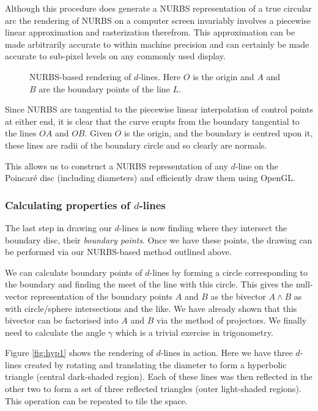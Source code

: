 Although this procedure does generate a NURBS representation of a true
circular arc the rendering of NURBS on a computer screen invariably involves
a piecewise linear approximation and rasterization therefrom. This approximation
can be made arbitrarily accurate to within machine precision and can certainly
be made accurate to sub-pixel levels on any commonly used display.

\begin{figure} \centering
{}
\caption{NURBS-based rendering of $d$-lines. Here $O$ is the origin and
$A$ and $B$ are the boundary points of the line $L$.}
\label{fig:nurbs}
\end{figure}

Since NURBS are tangential to the piecewise linear interpolation of control 
points
at either end, it is clear that the curve erupts from the boundary
tangential to the lines $OA$ and $OB$. Given $O$ is the origin, and the
boundary is centred upon it, these lines are radii of the boundary
circle and so clearly are normals.

This allows us to construct a NURBS representation of any $d$-line
on the Poincar\'e disc (including diameters) and efficiently draw them
using OpenGL. 

\subsubsection{Calculating properties of $d$-lines}

The last step in drawing our $d$-lines is now finding where they intersect
the boundary disc, their \emph{boundary points}. 
Once we have these points, the drawing can be performed
via our NURBS-based method outlined above.

We can calculate boundary points of $d$-lines
by forming a circle 
corresponding to the boundary and finding the 
meet of the line with this circle. This gives the null-vector
representation of the boundary points $A$ and $B$ as the
bivector $A \wedge B$ as with circle/sphere intersections and the like.
We have already shown that this bivector can be factorised into $A$ and 
$B$ via the method of projectors.
We finally need to calculate the angle $\gamma$ which is a trivial
exercise in trigonometry.

Figure
\ref{fig:hyp1} shows the rendering of $d$-lines in action.
Here we have three $d$-lines created by rotating and translating the
diameter to form a hyperbolic triangle (central dark-shaded
region). Each of these lines was then reflected in the other two to form 
a set of three reflected triangles (outer light-shaded regions). This
operation can be repeated to tile the space.

